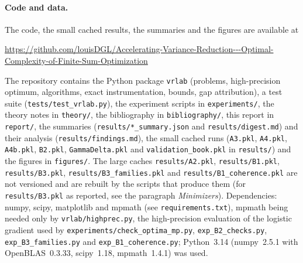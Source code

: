 \paragraph{Code and data.} The code, the small cached results, the summaries and the figures are available at
\begin{center}\small
\url{https://github.com/louisDGL/Accelerating-Variance-Reduction---Optimal-Complexity-of-Finite-Sum-Optimization}
\end{center}
The repository contains the Python package \nolinkurl{vrlab} (problems, high-precision optimum, algorithms, exact
instrumentation, bounds, gap attribution), a test suite (\nolinkurl{tests/test_vrlab.py}), the experiment scripts in
\nolinkurl{experiments/}, the theory notes in \nolinkurl{theory/}, the bibliography in \nolinkurl{bibliography/}, this
report in \nolinkurl{report/}, the summaries (\nolinkurl{results/*_summary.json} and \nolinkurl{results/digest.md}) and
their analysis (\nolinkurl{results/findings.md}), the small cached runs (\nolinkurl{A3.pkl}, \nolinkurl{A4.pkl},
\nolinkurl{A4b.pkl}, \nolinkurl{B2.pkl}, \nolinkurl{GammaDelta.pkl} and \nolinkurl{validation_book.pkl} in
\nolinkurl{results/}) and the figures in \nolinkurl{figures/}. The large caches
\nolinkurl{results/A2.pkl}, \nolinkurl{results/B1.pkl}, \nolinkurl{results/B3.pkl}, \nolinkurl{results/B3_families.pkl}
and \nolinkurl{results/B1_coherence.pkl} are not versioned and are rebuilt by the scripts that produce them (for
\nolinkurl{results/B3.pkl} as reported, see the paragraph \emph{Minimizers}). Dependencies: numpy, scipy, matplotlib and mpmath (see
\nolinkurl{requirements.txt}), mpmath being needed only by \nolinkurl{vrlab/highprec.py}, the high-precision evaluation
of the logistic gradient used by \nolinkurl{experiments/check_optima_mp.py}, \nolinkurl{exp_B2_checks.py},
\nolinkurl{exp_B3_families.py} and \nolinkurl{exp_B1_coherence.py}; Python~3.14 (numpy~2.5.1 with OpenBLAS~0.3.33,
scipy~1.18, mpmath~1.4.1) was used.


